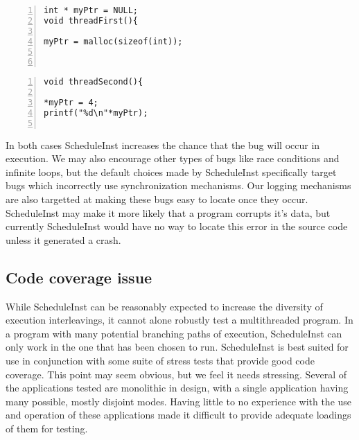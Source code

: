 \documentclass[10pt,]{article} %
\begin{document}
\begin{minipage}[b]{0.45\linewidth}
\centering
\lstset{language=C,label=SliceExaple}
\begin{lstlisting}[frame=single,numbers=left, mathescape,%
  title={Bad Memory Access Thread 1}, label=scopesEnteredContents]
int * myPtr = NULL;
void threadFirst(){

myPtr = malloc(sizeof(int));



\end{lstlisting}
\end{minipage}
\hspace{0.5cm}
\begin{minipage}[b]{0.45\linewidth}
\centering
\begin{lstlisting}[frame=single,numbers=left, mathescape,%
  title={Bad Memory Access Thread 2}, label=scopesEnteredContents]
void threadSecond(){

*myPtr = 4;
printf("%d\n"*myPtr);


\end{lstlisting}
\end{minipage}


In both cases ScheduleInst increases the chance that the bug will occur in execution.  We may also encourage other types of bugs like race conditions and infinite loops, but the default choices made by ScheduleInst specifically target bugs which incorrectly use synchronization mechanisms. Our logging mechanisms are also targetted at making these bugs easy to locate once they occur.  ScheduleInst may make it more likely that a program corrupts it’s data, but currently ScheduleInst would have no way to locate this error in the source code unless it generated a crash.



\subsection{Code coverage issue}

	While ScheduleInst can be reasonably expected to increase the diversity of execution interleavings, it cannot alone robustly test a multithreaded program.  In a program with many potential branching paths of execution, ScheduleInst can only work in the one that has been chosen to run.   ScheduleInst is best suited for use in conjunction with some suite of stress tests that provide good code coverage.  This point may seem obvious, but we feel it needs stressing.  Several of the applications tested are monolithic in design, with a single application having many possible, mostly disjoint modes.  Having little to no experience with the use and operation of these applications made it difficult to provide adequate loadings of them for testing. 
\end{document}
